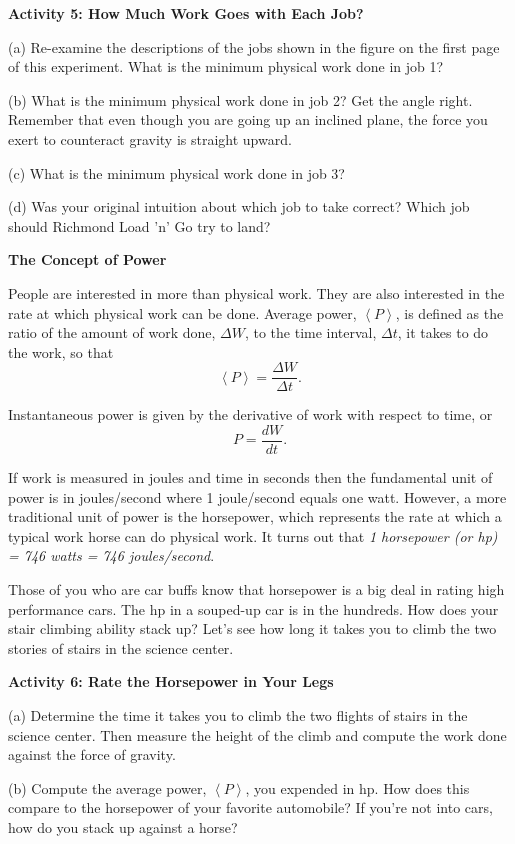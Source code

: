 \pagebreak[2]

\textbf{Activity 5: How Much Work Goes with Each Job? }

(a) Re-examine the descriptions of the jobs shown in the figure on the first
page of this experiment. What is the minimum physical work done in job 1?
\answerspace{20mm}

(b) What is the minimum physical work done in job 2? Get the angle right. 
Remember that even though you are going up an inclined plane, the force you 
exert to counteract gravity is straight upward.
\answerspace{20mm}

(c) What is the minimum physical work done in job 3?
\answerspace{15mm}

(d) Was your original intuition about which job to take correct? Which job 
should Richmond Load 'n' Go try to land?
\answerspace{15mm}

\textbf{The Concept of Power} 

People are interested in more than physical work. They are also interested in
the rate at which physical work can be done. Average power, \( \left\langle P\right\rangle  \),
is defined as the ratio of the amount of work done, \( \Delta  W\), to the
time interval, \( \Delta  t\), it takes to do the work, so that
\[
\left\langle P\right\rangle =\frac{\Delta W}{\Delta t}.\]


Instantaneous power is given by the derivative of work with respect to time,
or
\[
P=\frac{dW}{dt}.\]


If work is measured in joules and time in seconds then the fundamental unit
of power is in joules/second where 1 joule/second equals one watt. However,
a more traditional unit of power is the horsepower, which represents the rate
at which a typical work horse can do physical work. It turns out that \textit{1
horsepower (or hp) = 746 watts = 746 joules/second}.

Those of you who are car buffs know that horsepower is a big deal in rating
high performance cars. The hp in a souped-up car is in the hundreds. How does
your stair climbing ability stack up? Let's see how long it takes you to climb
the two stories of stairs in the science center.

\pagebreak[2]

\textbf{Activity 6: Rate the Horsepower in Your Legs} 

(a) Determine the time it takes you to climb the two flights of stairs in
the science center. Then measure the height of the climb and compute the work
done against the force of gravity.
\answerspace{20mm}

(b) Compute the average power, \( \left\langle P\right\rangle  \), you expended
in hp. How does this compare to the horsepower of your favorite automobile?
If you're not into cars, how do you stack up against a horse?
\answerspace{10mm}
